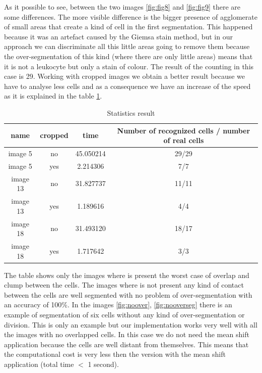 As it possible to see, between the two images \ref{fig:fig8} and \ref{fig:fig9} there are some differences. The more visible difference is the bigger presence of agglomerate of small areas that create a kind of cell in the first segmentation. This happened because it was an artefact caused by the Giemsa stain method, but in our approach we can discriminate all this little areas going to remove them because the over-segmentation of this kind (where there are only little areas) means that it is not a leukocyte but only a stain of colour. The result of the counting in this case is 29. 
Working with cropped images we obtain a better result because we have to analyse less cells and as a consequence we have an increase of the speed as it is explained in the table \ref{statistics}.
\begin{table}
\centering
\begin{tabular}{|c|c|c|c|}
\hline 
name & cropped & time & Number of recognized cells / number of real cells\\ 
\hline 
image 5 & no & 45.050214 & 29/29\\ 
\hline 
image 5 & yes & 2.214306 & 7/7\\ 
\hline 
image 13 & no & 31.827737 & 11/11 \\ 
\hline 
image 13 & yes & 1.189616 & 4/4 \\ 
\hline 
image 18 & no & 31.493120 & 18/17\\ 
\hline 
image 18 & yes & 1.717642 & 3/3 \\ 
\hline 
\end{tabular} 
\caption{Statistics result}
\label{statistics}
\end{table}
The table shows only the images where is present the worst case of overlap and clump between the cells. The images where is not present any kind of contact between the cells are well segmented with no problem of over-segmentation with an accuracy of 100\%. In the images  \ref{fig:noover}, \ref{fig:nooverseg} there is an example of segmentation of six cells without any kind of over-segmentation or division. This is only an example but our implementation works very well with all the images with no overlapped cells. In this case we do not need the mean shift application because the cells are well distant from themselves. This means that the computational cost is very less then the version with the mean shift application (total time $<$ 1 second).


